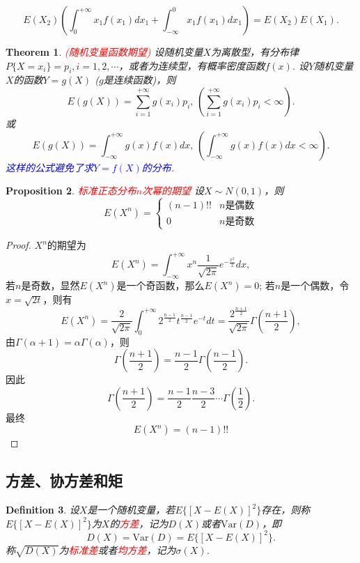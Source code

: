 \documentclass{article}
\newtheorem{theorem}{Theorem}[section]
\newtheorem{proposition}[theorem]{Proposition}
\newtheorem{definition}[theorem]{Definition}
\newcommand{\redt}[1]{\textcolor{red}{#1}}
\newcommand{\bluet}[1]{\textcolor{blue}{#1}}
\begin{document}
$$
E(X_2)\left(\int_0^{+\infty}x_1f(x_1)dx_1 +\int_{-\infty}^0x_1f(x_1)dx_1\right) = E(X_2)E(X_1).
$$


\begin{theorem}
\rm \redt{(随机变量函数期望)} 设随机变量$X$为离散型，有分布律$P\{X=x_i\}=p_i,i=1,2,\cdots$，或者为连续型，有概率密度函数$f(x)$. 设$Y$随机变量$X$的函数$Y=g(X)$ ($g$是连续函数)，则
$$
E(g(X))=\sum\limits_{i=1}^{+\infty}g(x_i)p_i,\,\left(\sum\limits_{i=1}^{+\infty}g(x_i)p_i < \infty \right) .
$$
或
$$
E(g(X)) = \int_{-\infty}^{+\infty}g(x)f(x)dx,\, \left(\int_{-\infty}^{+\infty}g(x)f(x)dx < \infty\right).
$$
\bluet{这样的公式避免了求$Y=f(X)$的分布}.
\end{theorem}

\begin{proposition}
\rm \redt{标准正态分布$n$次幂的期望} 设$X \sim N(0,1)$，则
$$
E(X^n) = \left\{  \begin{array}{ll}
(n-1)!! & n\text{是偶数} \\
0	& n\text{是奇数} 
\end{array} \right.
$$
\end{proposition}

\begin{proof}
$X^n$的期望为
$$
E(X^n) = \int_{-\infty}^{+\infty} x^n \frac{1}{\sqrt{2\pi}}e^{-\frac{x^2}{2}}dx,
$$
若$n$是奇数，显然$E(X^n)$是一个奇函数，那么$E(X^n)=0$; 若$n$是一个偶数，令$x=\sqrt{2t}$，则有
$$
E(X^n) = \frac{2}{\sqrt{2\pi}} \int_{0}^{+\infty} 2^{\frac{n-1}{2}}t^{\frac{n-1}{2}}e^{-t}dt = \frac{2^{\frac{n+1}{2}}}{\sqrt{2\pi}} \Gamma(\frac{n+1}{2}),
$$
由$\Gamma(\alpha+1) = \alpha \Gamma(\alpha)$，则
$$
\Gamma(\frac{n+1}{2}) = \frac{n-1}{2}\Gamma(\frac{n-1}{2}).
$$
因此
$$
\Gamma(\frac{n+1}{2}) = \frac{n-1}{2} \frac{n-3}{2} \cdots \Gamma(\frac{1}{2}). 
$$
最终
$$
E(X^n) = (n-1)!!
$$
\end{proof}


\newpage
\subsection{方差、协方差和矩}

\begin{definition}
\rm 设$X$是一个随机变量，若$E\{\left[X-E(X)\right]^2\}$存在，则称$E\{\left[X-E(X)\right]^2\}$为$X$的\redt{方差}，记为$D(X)$或者$\text{Var}(D)$，即
$$
D(X) = \text{Var}(D) = E\{\left[X-E(X)\right]^2\}.
$$
称$\sqrt{D(X)}$为\redt{标准差}或者\redt{均方差}，记为$\sigma(X)$. 
\end{definition}
\end{document}

